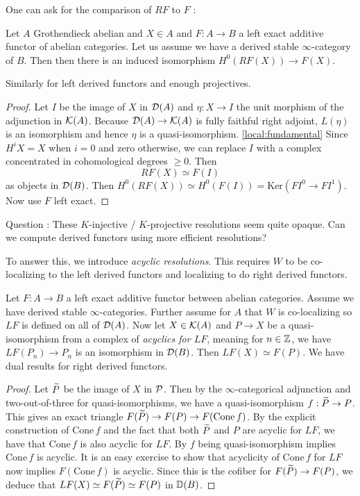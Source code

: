 \documentclass{article}
\begin{document}
One can ask for the comparison of $RF$ to $F$ : 
\begin{prop}
  Let $A$ Grothendieck abelian and $X \in A$
  and $F : A \to B$ a left exact additive functor of abelian categories.
  Let us assume we have a derived stable $\infty$-category of $B$.
  Then then there is an induced isomorphism $H^0(RF(X)) \to F(X)$.
  
  Similarly for left derived functors and enough projectives.
\end{prop}
\begin{proof}
  Let $I$ be the image of $X$ in $\mathcal{D}(A)$
  and $\eta : X \to I$ the unit morphism of the adjunction in $\mathcal{K}(A)$.
  Because $\mathcal{D}(A) \to \mathcal{K}(A)$ is fully faithful right adjoint,
  $L(\eta)$ is an isomorphism and hence $\eta$ is a quasi-isomorphism.
  \ref{local:fundamental}
  Since $H^i X = X$ when $i = 0$ and zero otherwise,
  we can replace $I$ with a complex concentrated in cohomological degrees 
  $\geq 0$.
  Then \[
    RF(X) \simeq F(I)
  \]
  as objects in $\mathcal{D}(B)$.
  Then $H^0(RF(X)) \simeq H^0(F(I)) = \mathrm{Ker}(F I^0 \to F I^1)$.
  Now use $F$ left exact.
\end{proof}
\begin{center}
  Question : These $K$-injective / $K$-projective resolutions
  seem quite opaque. Can we compute derived functors using 
  more efficient resolutions?
\end{center}
To answer this, we introduce \emph{acyclic resolutions}.
This requires $W$ to be co-localizing to the left derived functors
and localizing to do right derived functors.
\begin{prop}
  Let $F : A \to B$ a left exact additive functor between abelian categories.
  Assume we have derived stable $\infty$-categories.
  Further assume for $A$ that $W$ is co-localizing
  so $LF$ is defined on all of $\mathcal{D}(A)$.
  Now let $X \in \mathcal{K}(A)$ and $P \to X$ be a quasi-isomorphism
  from a complex of \emph{acyclics for $LF$}, meaning 
  for $n \in \mathbb{Z}$, we have $LF(P_n) \to P_n$ is an isomorphism in $\mathcal{D}(B)$.
  Then $LF(X) \simeq F(P)$.
  We have dual results for right derived functors.
\end{prop}
\begin{proof}
  Let $\widetilde{P}$ be the image of $X$ in $\mathcal{P}$.
  Then by the $\infty$-categorical adjunction
  and two-out-of-three for quasi-isomorphisms,
  we have a quasi-isomorphism $f : \widetilde{P} \to P$.
  This gives an exact triangle $F(\widetilde{P}) \to F(P) \to F(\mathrm{Cone}\,f)$.
  By the explicit construction of $\mathrm{Cone}\,f$ and
  the fact that both $\widetilde{P}$ and $P$ are acyclic for $LF$,
  we have that $\mathrm{Cone}\,f$ is also acyclic for $LF$.
  By $f$ being quasi-isomorphism implies $\mathrm{Cone}\,f$ is acyclic.
  It is an easy exercise to show that 
  acyclicity of $\mathrm{Cone}\,f$ for $LF$ now implies
  $F(\mathrm{Cone}\,f)$ is acyclic.
  Since this is the cofiber for $F(\widetilde{P}) \to F(P)$,
  we deduce that $LF(X) \simeq F(\widetilde{P}) \simeq F(P)$ in $\mathbb{D}(B)$.
\end{proof}
\end{document}
